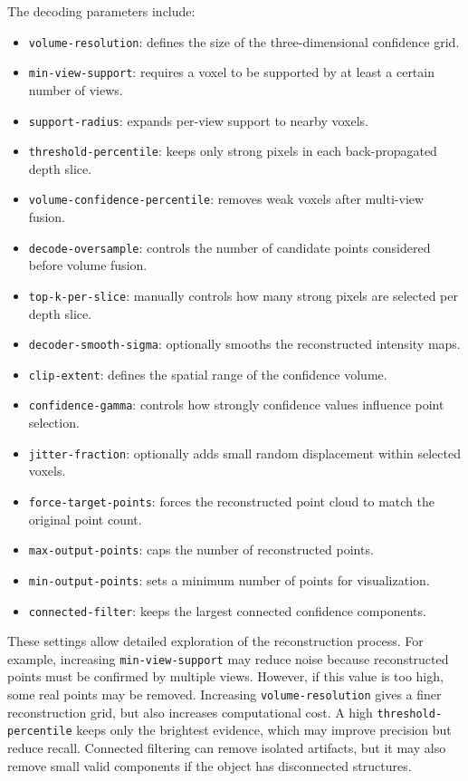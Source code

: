 \documentclass{article}
\begin{document}
\begin{normalsize}
The decoding parameters include:

\begin{itemize}
    \item \texttt{volume-resolution}: defines the size of the three-dimensional confidence grid.
    \item \texttt{min-view-support}: requires a voxel to be supported by at least a certain number of views.
    \item \texttt{support-radius}: expands per-view support to nearby voxels.
    \item \texttt{threshold-percentile}: keeps only strong pixels in each back-propagated depth slice.
    \item \texttt{volume-confidence-percentile}: removes weak voxels after multi-view fusion.
    \item \texttt{decode-oversample}: controls the number of candidate points considered before volume fusion.
    \item \texttt{top-k-per-slice}: manually controls how many strong pixels are selected per depth slice.
    \item \texttt{decoder-smooth-sigma}: optionally smooths the reconstructed intensity maps.
    \item \texttt{clip-extent}: defines the spatial range of the confidence volume.
    \item \texttt{confidence-gamma}: controls how strongly confidence values influence point selection.
    \item \texttt{jitter-fraction}: optionally adds small random displacement within selected voxels.
    \item \texttt{force-target-points}: forces the reconstructed point cloud to match the original point count.
    \item \texttt{max-output-points}: caps the number of reconstructed points.
    \item \texttt{min-output-points}: sets a minimum number of points for visualization.
    \item \texttt{connected-filter}: keeps the largest connected confidence components.
\end{itemize}

These settings allow detailed exploration of the reconstruction process. For example, increasing \texttt{min-view-support} may reduce noise because reconstructed points must be confirmed by multiple views. However, if this value is too high, some real points may be removed. Increasing \texttt{volume-resolution} gives a finer reconstruction grid, but also increases computational cost. A high \texttt{threshold-percentile} keeps only the brightest evidence, which may improve precision but reduce recall. Connected filtering can remove isolated artifacts, but it may also remove small valid components if the object has disconnected structures.


\end{normalsize}
\end{document}
